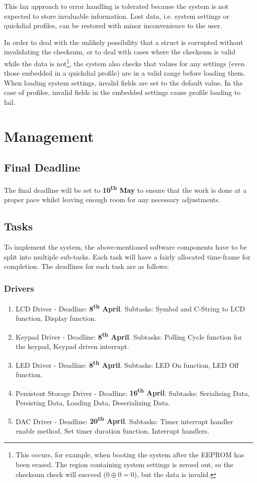 \documentclass[11pt,a4paper,twocolumn]{scrartcl}
\begin{document}
This lax approach to error handling is tolerated because the system is not expected to store invaluable information. Lost data, i.e. system settings or quickdial profiles, can be restored with minor inconvenience to the user.

In order to deal with the unlikely possibility that a struct is corrupted without invalidating the checksum, or to deal with cases where the checksum is valid while the data is not\footnote{This occurs, for example, when booting the system after the EEPROM has been erased. The region containing system settings is zeroed out, so the checksum check will succeed ($0 \oplus 0 = 0$), but the data is invalid.}, the system also checks that values for any settings (even those embedded in a quickdial profile) are in a valid range before loading them. When loading system settings, invalid fields are set to the default value. In the case of profiles, invalid fields in the embedded settings cause profile loading to fail.

\section{Management} \label{schedule}
\subsection{Final Deadline}
The final deadline will be set to \textbf{10\textsuperscript{th} May} to ensure that the work is done at a proper pace whilst leaving enough room for any necessary 
adjustments.

\subsection{Tasks}
To implement the system, the above-mentioned software components have to be split into multiple sub-tasks. Each task will have a fairly allocated time-frame for completion. The deadlines for each task are as follows:
\subsubsection{Drivers}
\begin{enumerate}
    \item LCD Driver - Deadline: \textbf{8\textsuperscript{th} April}. Subtasks: Symbol and C-String to LCD function, Display function.
    \item Keypad Driver - Deadline: \textbf{8\textsuperscript{th} April}. Subtasks: Polling Cycle function for the keypad, Keypad driven interrupt.
    \item LED Driver - Deadline: \textbf{8\textsuperscript{th} April}. Subtasks: LED On function, LED Off function.
    \item Persistent Storage Driver - Deadline: \textbf{16\textsuperscript{th} April}. Subtasks: Serialising Data, Persisting Data, Loading Data, Deserializing Data.
    \item DAC Driver - Deadline: \textbf{20\textsuperscript{th} April}. Subtasks: Timer interrupt handler enable method, Set timer duration function, Interrupt handlers.
\end{enumerate}
\end{document}
